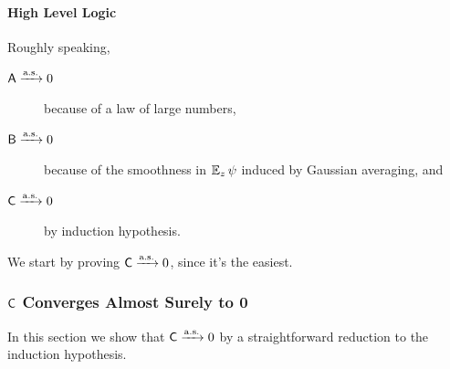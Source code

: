\documentclass[main.tex]{subfiles}
\begin{document}
\paragraph{High Level Logic}
Roughly speaking,
\begin{description}
  \item[$\mathsf{A} \xrightarrow{\mathrm{a.s.}} 0$] because of a law of large numbers,
  \item[$\mathsf{B} \xrightarrow{\mathrm{a.s.}} 0$] because of the smoothness in $\operatorname*{\mathbb{E}}_z \psi$ induced by Gaussian averaging, and
  \item[$\mathsf{C} \xrightarrow{\mathrm{a.s.}} 0$] by induction hypothesis.
\end{description}
We start by proving $\mathsf{C} \xrightarrow{\mathrm{a.s.}} 0$, since it's the easiest.

\subsubsection{\texorpdfstring{$\mathsf{C}$}{C} Converges Almost Surely to 0}

In this section we show that $\mathsf{C} \xrightarrow{\mathrm{a.s.}} 0$ by a straightforward reduction to the induction hypothesis.
\end{document}
